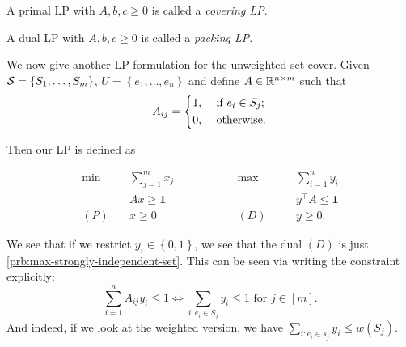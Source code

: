 \begin{definition}[Covering LP]\label{def:covering-LP}
	A primal LP with \(A, b, c \geq 0\) is called a \emph{covering LP}.
\end{definition}

\begin{definition}[Packing LP]\label{def:packing-LP}
	A dual LP with \(A, b, c \geq 0\) is called a \emph{packing LP}.
\end{definition}

We now give another LP formulation for the unweighted \hyperref[prb:set-cover]{set cover}. Given \(\mathcal{\MakeUppercase{S}} = \left\{ S_1, \ldots , S_m  \right\} \), \(U = \left\{ e_1, \ldots , e_n  \right\} \) and define \(A\in \mathbb{\MakeUppercase{r}} ^{n\times m}\) such that
\[
	A_{ij} = \begin{dcases}
		1, & \text{ if } e_i\in S_j ; \\
		0, & \text{ otherwise}.
	\end{dcases}
\]

Then our LP is defined as

\[
	\begin{alignedat}{5}
		\min~&\sum_{j=1}^{m} x_j\qquad\qquad&&\max ~&&\sum_{i =1}^{n} y_i\\
		&Ax \geq \bm{1} 				&&		&&y^{\top}A\leq \bm{1}\\
		(P)\quad	&x\geq  0 	&&(D)\quad&& y \geq 0.
	\end{alignedat}
\]

We see that if we restrict \(y_i\in \left\{ 0, 1 \right\} \), we see that the dual \((D)\) is just \autoref{prb:max-strongly-independent-set}. This can be seen via writing the constraint explicitly:
\[
	\sum_{i=1}^{n} A_{ij} y_{i} \leq 1 \iff \sum_{i\colon e_i\in S_j} y_{i} \leq 1 \text{ for } j\in[m].
\]
And indeed, if we look at the weighted version, we have \(\sum_{i\colon e_i\in s_j} y_{i} \leq w(S_j)\).

